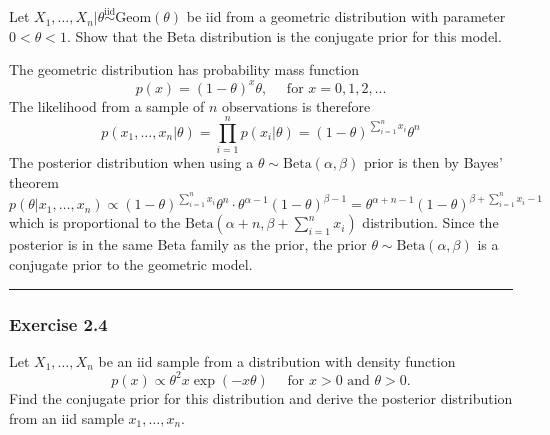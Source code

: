 \documentclass[
  letterpaper,
  DIV=11,
  numbers=noendperiod]{scrartcl}
\begin{document}
Let
\(X_1,\ldots,X_n \vert \theta \overset{\mathrm{iid}}{\sim} \mathrm{Geom}(\theta)\)
be iid from a geometric distribution with parameter \(0<\theta<1\). Show
that the Beta distribution is the conjugate prior for this model.

\begin{tcolorbox}[enhanced jigsaw, coltitle=black, breakable, colbacktitle=quarto-callout-note-color!10!white, colframe=quarto-callout-note-color-frame, bottomrule=.15mm, toprule=.15mm, rightrule=.15mm, arc=.35mm, colback=white, opacityback=0, bottomtitle=1mm, leftrule=.75mm, title={Solution}, titlerule=0mm, toptitle=1mm, left=2mm, opacitybacktitle=0.6]

The geometric distribution has probability mass function \[
p(x) = (1-\theta)^{x}\theta, \quad \text{ for }x=0,1,2,...
\] The likelihood from a sample of \(n\) observations is therefore \[
p(x_{1},\ldots,x_{n}\vert\theta) = \prod_{i=1}^n p(x_i \vert \theta)= (1-\theta)^{\sum_{i=1}^n x_i}\theta^{n}
\] The posterior distribution when using a
\(\theta \sim \mathrm{Beta}(\alpha,\beta)\) prior is then by Bayes'
theorem \[
p(\theta\vert x_{1},\ldots,x_n) \propto 
(1-\theta)^{\sum_{i=1}^n x_i} \theta^{n} \cdot \theta^{\alpha-1}(1-\theta)^{\beta-1}
=\theta^{\alpha + n-1}(1-\theta)^{\beta + \sum_{i=1}^n x_i-1}
\] which is proportional to the
\(\mathrm{Beta}(\alpha+n,\beta+\sum_{i=1}^n x_i)\) distribution. Since
the posterior is in the same Beta family as the prior, the prior
\(\theta \sim \mathrm{Beta}(\alpha,\beta)\) is a conjugate prior to the
geometric model.

\end{tcolorbox}

\begin{center}\rule{0.5\linewidth}{0.5pt}\end{center}

\subsubsection{Exercise 2.4}\label{exercise-2.4}

Let \(X_1,\ldots,X_n\) be an iid sample from a distribution with density
function \[
p(x) \propto \theta^2 x \exp (-x\theta)\quad \text{ for } x>0 \text{ and } \theta>0. 
\] Find the conjugate prior for this distribution and derive the
posterior distribution from an iid sample \(x_1,\ldots,x_n\).
\end{document}
